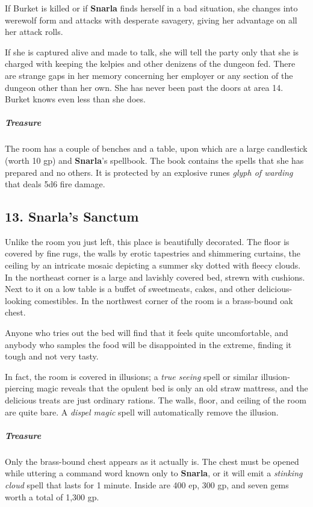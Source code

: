 \documentclass[10pt,a4paper,twoside,bg=print,twocolumn,openany,nodeprecatedcode]{dndbook}
\begin{document}
If Burket is killed or if \textbf{Snarla} finds herself in a bad situation, she changes into werewolf form and attacks with desperate savagery, giving her advantage on all her attack rolls.

If she is captured alive and made to talk, she will tell the party only that she is charged with keeping the kelpies and other denizens of the dungeon fed. There are strange gaps in her memory concerning her employer or any section of the dungeon other than her own. She has never been past the doors at area 14. Burket knows even less than she does.

\subparagraph{Treasure}
The room has a couple of benches and a table, upon which are a large candlestick (worth 10 gp) and \textbf{Snarla}'s spellbook. The book contains the spells that she has prepared and no others. It is protected by an explosive runes \textit{glyph of warding} that deals 5d6 fire damage.

\subsection{13. Snarla's Sanctum}
\begin{DndReadAloud}{}
Unlike the room you just left, this place is beautifully decorated. The floor is covered by fine rugs, the walls by erotic tapestries and shimmering curtains, the ceiling by an intricate mosaic depicting a summer sky dotted with fleecy clouds. In the northeast corner is a large and lavishly covered bed, strewn with cushions. Next to it on a low table is a buffet of sweetmeats, cakes, and other delicious-looking comestibles. In the northwest corner of the room is a brass-bound oak chest.

\end{DndReadAloud}

Anyone who tries out the bed will find that it feels quite uncomfortable, and anybody who samples the food will be disappointed in the extreme, finding it tough and not very tasty.

In fact, the room is covered in illusions; a \textit{true seeing} spell or similar illusion-piercing magic reveals that the opulent bed is only an old straw mattress, and the delicious treats are just ordinary rations. The walls, floor, and ceiling of the room are quite bare. A \textit{dispel magic} spell will automatically remove the illusion.

\subparagraph{Treasure}
Only the brass-bound chest appears as it actually is. The chest must be opened while uttering a command word known only to \textbf{Snarla}, or it will emit a \textit{stinking cloud} spell that lasts for 1 minute. Inside are 400 ep, 300 gp, and seven gems worth a total of 1,300 gp.
\end{document}
